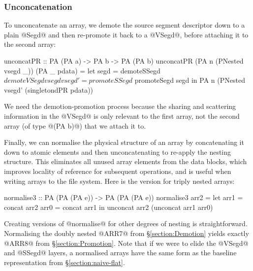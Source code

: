 \subsubsection{Unconcatenation}

To unconcatenate an array, we demote the source segment descriptor down to a plain @Segd@ and then re-promote it back to a @VSegd@, before attaching it to the second array:
\par
\begin{small}
\begin{code}
 unconcatPR :: PA (PA a) -> PA b -> PA (PA b)
 unconcatPR (PA n (PNested vsegd _)) (PA _ pdata)
  = let  segd    = demoteSSegd  $ demoteVSegd vsegd
         vsegd'  = promoteSSegd $ promoteSegd segd
    in   PA n (PNested vsegd' (singletondPR pdata))
\end{code}
\end{small}
%
We need the demotion-promotion process because the sharing and scattering information in the @VSegd@ is only relevant to the first array,  not the second array (of type @(PA b)@) that we attach it to. 

Finally, we can normalise the physical structure of an array by concatenating it down to atomic elements and then unconcatenating to re-apply the nesting structure. This eliminates all unused array elements from the data blocks, which improves locality of reference for subsequent operations, and is useful when writing arrays to the file system. Here is the version for triply nested arrays: 
\begin{small}
\begin{code}
 normalise3 :: PA (PA (PA e)) -> PA (PA (PA e))
 normalise3 arr2
  = let  arr1    = concat arr2
         arr0    = concat arr1
    in   unconcat arr2 (unconcat arr1 arr0) 
\end{code}
\end{small}        
Creating versions of @normalise@ for other degrees of nesting is straightforward. Normalising the doubly nested @ARR7@ from \S\ref{section:Demotion} yields exactly @ARR8@ from \S\ref{section:Promotion}. Note that if we were to elide the @VSegd@ and @SSegd@ layers, a normalised arrays have the same form as the baseline representation from \S\ref{section:naive-flat}.


